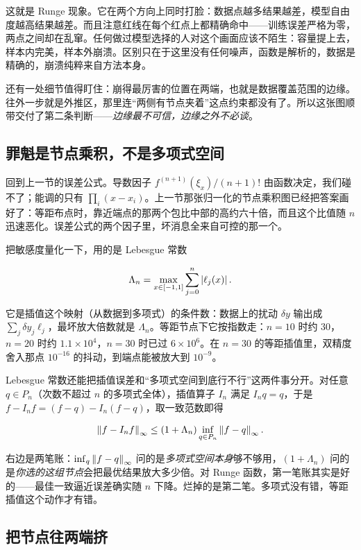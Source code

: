 这就是 Runge 现象。它在两个方向上同时打脸：数据点越多结果越差，模型自由度越高结果越差。而且注意红线在每个红点上都精确命中——训练误差严格为零，两点之间却在乱窜。任何做过模型选择的人对这个画面应该不陌生：容量提上去，样本内完美，样本外崩溃。区别只在于这里没有任何噪声，函数是解析的，数据是精确的，崩溃纯粹来自方法本身。

还有一处细节值得盯住：崩得最厉害的位置在两端，也就是数据覆盖范围的边缘。往外一步就是外推区，那里连``两侧有节点夹着''这点约束都没有了。所以这张图顺带交付了第二条判断——\emph{边缘最不可信，边缘之外不必谈}。

\subsection{罪魁是节点乘积，不是多项式空间}

回到上一节的误差公式。导数因子 \(f^{(n+1)}(\xi_x)/(n+1)!\) 由函数决定，我们碰不了；能调的只有 \(\prod_i(x-x_i)\)。上一节那张归一化的节点乘积图已经把答案画好了：等距布点时，靠近端点的那两个包比中部的高约六十倍，而且这个比值随 \(n\) 迅速恶化。误差公式的两个因子里，坏消息全来自可控的那一个。

把敏感度量化一下，用的是 Lebesgue 常数

\[
\Lambda_n=\max_{x\in[-1,1]}\sum_{j=0}^{n}\left|\ell_j(x)\right|.
\]

它是插值这个映射（从数据到多项式）的条件数：数据上的扰动 \(\delta y\) 输出成 \(\sum_j\delta y_j\ell_j\)，最坏放大倍数就是 \(\Lambda_n\)。等距节点下它按指数走：\(n=10\) 时约 \(30\)，\(n=20\) 时约 \(1.1\times10^{4}\)，\(n=30\) 时已过 \(6\times10^{6}\)。在 \(n=30\) 的等距插值里，双精度舍入那点 \(10^{-16}\) 的抖动，到端点能被放大到 \(10^{-9}\)。

Lebesgue 常数还能把插值误差和``多项式空间到底行不行''这两件事分开。对任意 \(q\in P_n\)（次数不超过 \(n\) 的多项式全体），插值算子 \(I_n\) 满足 \(I_nq=q\)，于是 \(f-I_nf=(f-q)-I_n(f-q)\)，取一致范数即得

\[
\left\lVert f-I_nf\right\rVert_\infty\le(1+\Lambda_n)\inf_{q\in P_n}\left\lVert f-q\right\rVert_\infty.
\]

右边是两笔账：\(\inf_q\left\lVert f-q\right\rVert_\infty\) 问的是\emph{多项式空间本身}够不够用，\((1+\Lambda_n)\) 问的是\emph{你选的这组节点}会把最优结果放大多少倍。对 Runge 函数，第一笔账其实是好的——最佳一致逼近误差确实随 \(n\) 下降。烂掉的是第二笔。多项式没有错，等距插值这个动作才有错。

\subsection{把节点往两端挤}

